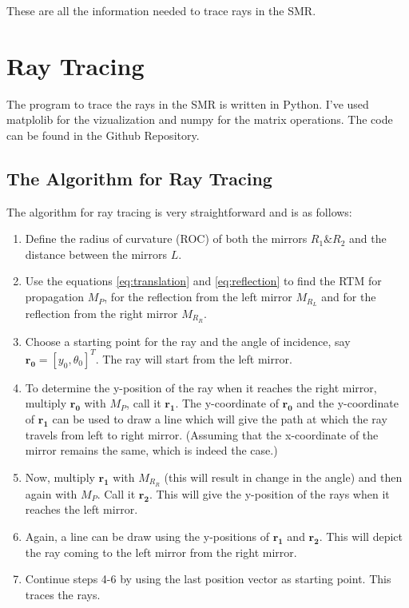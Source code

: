 \documentclass[12pt]{article}
\begin{document}
These are all the information needed to trace rays in the SMR.

\section{Ray Tracing}

The program to trace the rays in the SMR is written in Python. I've used {\color{cyan} matplolib}\cite{matplolib} for the vizualization and {\color{cyan} numpy}\cite{numpy} for the matrix operations. The code can be found in the {\color{cyan} Github Repository}\cite{git-repo}.

\subsection{The Algorithm for Ray Tracing}
The algorithm for ray tracing is very straightforward and is as follows:
\begin{enumerate}
    \item Define the radius of curvature (ROC) of both the mirrors \(R_1 \& R_2\) and the distance between the mirrors \(L\).
    \item Use the equations \ref{eq:translation} and \ref{eq:reflection} to find the RTM for propagation \(M_P\), for the reflection from the left mirror \(M_{R_L}\) and for the reflection from the right mirror \(M_{R_R}\).
    \item Choose a starting point for the ray and the angle of incidence, say \(\mathbf{r_0} = [y_0, \theta_0]^T\). The ray will start from the left mirror.
    \item To determine the y-position of the ray when it reaches the right mirror, multiply \(\mathbf{r_0}\) with \(M_P\), call it \(\mathbf{r_1}\). The y-coordinate of \(\mathbf{r_0}\) and the y-coordinate of \(\mathbf{r_1}\) can be used to draw a line which will give the path at which the ray travels from left to right mirror. (Assuming that the x-coordinate of the mirror remains the same, which is indeed the case.)
    \item Now, multiply \(\mathbf{r_1}\) with \(M_{R_R}\) (this will result in change in the angle) and then again with \(M_P\). Call it \(\mathbf{r_2}\). This will give the y-position of the rays when it reaches the left mirror.
    \item Again, a line can be draw using the y-positions of \(\mathbf{r_1}\) and \(\mathbf{r_2}\). This will depict the ray coming to the left mirror from the right mirror.
    \item Continue steps 4-6 by using the last position vector as starting point. This traces the rays.
\end{enumerate}
\end{document}
